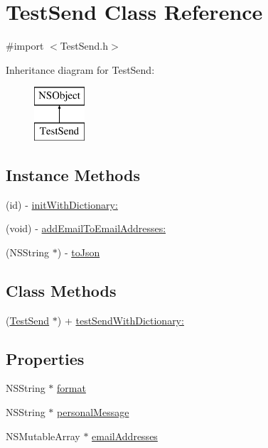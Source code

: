 \hypertarget{interface_test_send}{\section{Test\-Send Class Reference}
\label{interface_test_send}
}


{\ttfamily \#import $<$Test\-Send.\-h$>$}

Inheritance diagram for Test\-Send\-:\begin{figure}[H]
\begin{center}
\leavevmode
\includegraphics[height=2.000000cm]{interface_test_send}
\end{center}
\end{figure}
\subsection*{Instance Methods}
\begin{DoxyCompactItemize}
\item 
(id) -\/ \hyperlink{interface_test_send_a0c64e5cfc992ca613ffc0fa160ecf62d}{init\-With\-Dictionary\-:}
\item 
(void) -\/ \hyperlink{interface_test_send_a12b6ea779bb944f98e57997a140d65d3}{add\-Email\-To\-Email\-Addresses\-:}
\item 
(N\-S\-String $\ast$) -\/ \hyperlink{interface_test_send_a3bf9c87e917acc970e349b02ead13a15}{to\-Json}
\end{DoxyCompactItemize}
\subsection*{Class Methods}
\begin{DoxyCompactItemize}
\item 
(\hyperlink{interface_test_send}{Test\-Send} $\ast$) + \hyperlink{interface_test_send_a4c6865254eeb50999c7bdc5deb392a05}{test\-Send\-With\-Dictionary\-:}
\end{DoxyCompactItemize}
\subsection*{Properties}
\begin{DoxyCompactItemize}
\item 
N\-S\-String $\ast$ \hyperlink{interface_test_send_a9b8f331d88f602bfb6281faaaa1640f0}{format}
\item 
N\-S\-String $\ast$ \hyperlink{interface_test_send_ae45669f79ceeb6e5b3ec4c47fa7471fc}{personal\-Message}
\item 
N\-S\-Mutable\-Array $\ast$ \hyperlink{interface_test_send_ae3149637744140d9ce2eadea8d3acd80}{email\-Addresses}
\end{DoxyCompactItemize}


